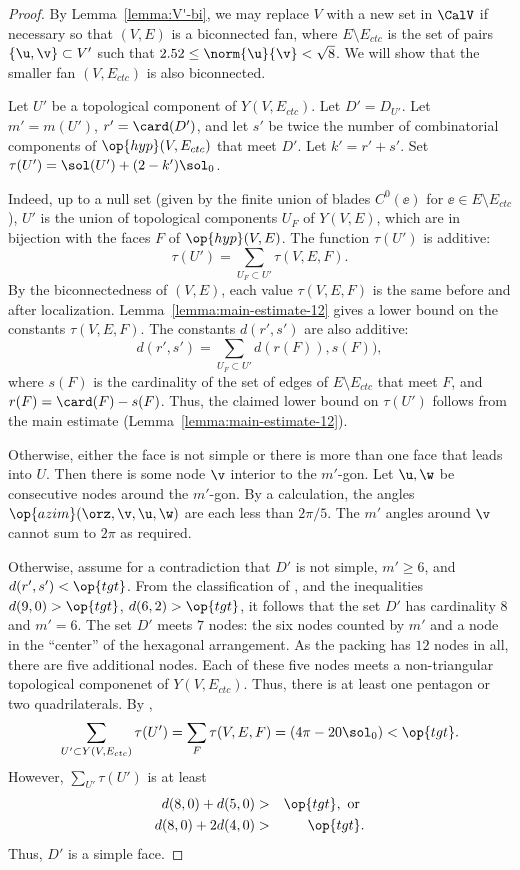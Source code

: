 \begin{proof}
  By Lemma~\ref{lemma:V'-bi}, we may replace $V$ with a new set in
  $\CalV$ if necessary so that $(V,E)$ is a biconnected fan, where
  $E\setminus E_{ctc}$ is the set of pairs $\{\u,\v\}\subset V'$ such
  that $2.52\le\norm{\u}{\v} <\sqrt8$.  We will show that the smaller
  fan $(V,E_{ctc})$ is also biconnected.

Let $U'$ be a topological component of $Y(V,E_{ctc})$.  Let $D'=D_{U'}$.
Let $m'=m(U')$, $r' = \card(D')$, and
let $s'$ be twice the number of combinatorial components of $\op{hyp}(V,E_{ctc})$
that meet $D'$.  Let $k'=r'+s'$.  Set $\tau(U') = \sol(U') + (2-k')\sol_0$.

  Indeed,
up to a null set (given by the finite union of blades $C^0(\ee)$ for
$\ee\in E\setminus E_{ctc}$), $U'$ is the union of topological
components $U_F$ of $Y(V,E)$, which are in bijection with the faces
$F$ of $\op{hyp}(V,E)$.  The function $\tau(U')$ is additive:
\[
\tau(U') = \sum_{U_F\subset U'} \tau(V,E,F).
\]
By the biconnectedness of $(V,E)$, each value $\tau(V,E,F)$ is the
same before and after localization.
Lemma~\ref{lemma:main-estimate-12} gives a lower bound on the
constants $\tau(V,E,F)$.  The constants $d(r',s')$ are also additive:
\[
d(r',s') = \sum_{U_F\subset U'} d(r(F)),s(F)),
\]
where $s(F)$ is the cardinality of the set of edges of $E\setminus
E_{ctc}$ that meet $F$, and $r(F) = \card(F)-s(F)$.  Thus, the claimed
lower bound on $\tau(U')$ follows from the main estimate
(Lemma~\ref{lemma:main-estimate-12}).


 Otherwise, either
the face is not simple or there is more than one face that leads into
$U$.  Then there is some node $\v$ interior to the $m'$-gon.  Let
$\u,\w$ be consecutive nodes around the $m'$-gon.  By a
calculation, %
the angles $\op{azim}(\orz,\v,\u,\w)$ are each less than $2\pi/5$. The
$m'$ angles around $\v$ cannot sum to $2\pi$ as required.

  Otherwise, assume for a contradiction
that $D'$ is not simple,  $m'\ge 6$, and $d(r',s')<\op{tgt}$.
  From the classification of \cite[p.~126,~Fig.~12.1]{Hales:2006:DCG},
  and the inequalities $d(9,0) > \op{tgt}$, $d(6,2) > \op{tgt}$, it
  follows that the set $D'$ has cardinality $8$ and $m'=6$.
The set $D'$ meets $7$ nodes: the six
  nodes counted by $m'$ and a node in the ``center'' of the hexagonal
  arrangement.  As the packing has $12$ nodes in all, there are five
  additional nodes.  Each of these five nodes meets a non-triangular
  topological componenet of $Y(V,E_{ctc})$.  Thus, there is at least one pentagon
or two quadrilaterals.
By , 
\[
  \sum_{U'\subset Y(V,E_{ctc})} \tau(U') 
=\sum_F \tau(V,E,F) = (4\pi - 20\sol_0) < \op{tgt}.
\]
However, $\sum_{U'} \tau(U')$ is at least
\begin{eqnarray*}
d(8,0) + d(5,0) &>& \op{tgt}, \text{ or }\\
d(8,0) + 2 d(4,0) &>& \op{tgt}.
\end{eqnarray*}
Thus, $D'$ is a simple face.
%
%


\end{proof}
